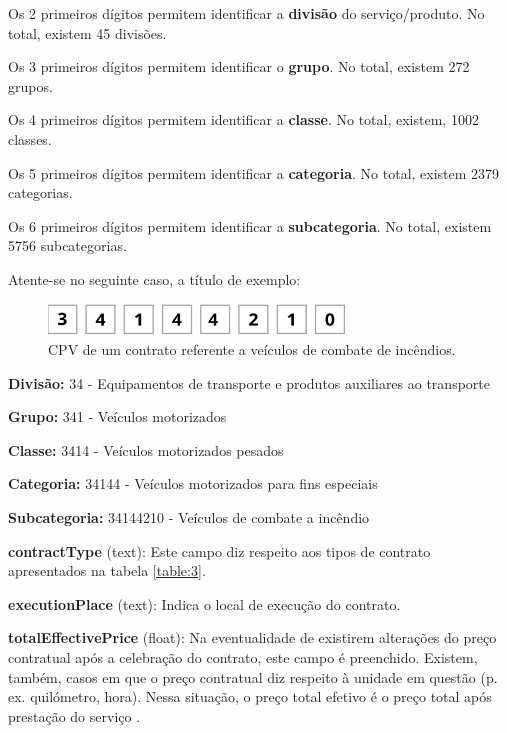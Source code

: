 \begin{my_itemize}
\begin{my_itemize}
	\item[$\circ$]  Os 2 primeiros dígitos permitem identificar a \textbf{divisão} do serviço/produto. No total, existem 45 divisões.
	\item[$\circ$]  Os 3 primeiros dígitos permitem identificar o \textbf{grupo}. No total, existem 272 grupos.
	\item[$\circ$]  Os 4 primeiros dígitos permitem identificar a \textbf{classe}. No total, existem, 1002 classes.
	\item[$\circ$]  Os 5 primeiros dígitos permitem identificar a \textbf{categoria}. No total, existem 2379 categorias.
	\item[$\circ$]  Os 6 primeiros dígitos permitem identificar a \textbf{subcategoria}. No total, existem 5756 subcategorias.
\end{my_itemize}

Atente-se no seguinte caso, a título de exemplo:

\begin{figure}[H]
	\centering
	\includegraphics[width=0.7\textwidth]{imagens/cpv.png}
	\caption{CPV de um contrato referente a veículos de combate de incêndios.}
	\label{fig:cpv}
\end{figure}


\begin{my_itemize}
	\item[$\circ$]  \textbf{Divisão:} 34 - Equipamentos de transporte e produtos auxiliares ao transporte
	\item[$\circ$]  \textbf{Grupo:} 341 - Veículos motorizados
	\item[$\circ$]  \textbf{Classe:} 3414 - Veículos motorizados pesados
	\item[$\circ$]  \textbf{Categoria:} 34144 - Veículos motorizados para fins especiais
	\item[$\circ$]  \textbf{Subcategoria:} 34144210 - Veículos de combate a incêndio
\end{my_itemize}



\item \textbf{contractType} (text): Este campo diz respeito aos tipos de contrato apresentados na tabela \ref{table:3}. 

\item \textbf{executionPlace} (text): Indica o local de execução do contrato. 

\item \textbf{totalEffectivePrice} (float): Na eventualidade de existirem alterações do preço contratual após a celebração do contrato, este campo é preenchido. Existem, também, casos em que o preço contratual diz respeito à unidade em questão (p. ex. quilómetro, hora). Nessa situação, o preço total efetivo é o preço total após prestação do serviço \cite{jardinagem}.  

\end{my_itemize}

